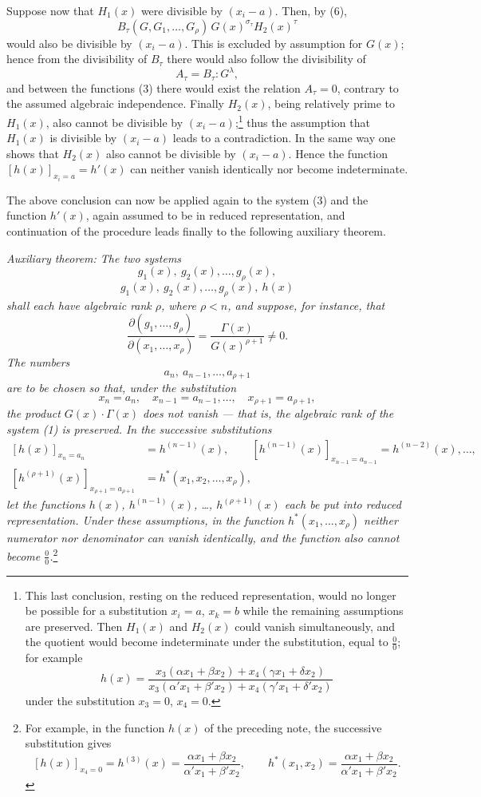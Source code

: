\documentclass[11pt]{article}
\begin{document}
Suppose now that $H_1(x)$ were divisible by $(x_i-a)$. Then, by (6),
\[
  B_\tau(G,G_1,\ldots,G_\rho)\,G(x)^{\sigma_\tau}H_2(x)^\tau
\]
would also be divisible by $(x_i-a)$. This is excluded by assumption for $G(x)$; hence from the divisibility of $B_\tau$ there would also follow the divisibility of
\[
  A_\tau=B_\tau:G^\lambda,
\]
and between the functions (3) there would exist the relation $A_\tau=0$, contrary to the assumed algebraic independence. Finally $H_2(x)$, being relatively prime to $H_1(x)$, also cannot be divisible by $(x_i-a)$;\footnote{This last conclusion, resting on the reduced representation, would no longer be possible for a substitution $x_i=a$, $x_k=b$ while the remaining assumptions are preserved. Then $H_1(x)$ and $H_2(x)$ could vanish simultaneously, and the quotient would become indeterminate under the substitution, equal to $\frac{0}{0}$; for example
\[
 h(x)=\frac{x_3(\alpha x_1+\beta x_2)+x_4(\gamma x_1+\delta x_2)}
 {x_3(\alpha' x_1+\beta' x_2)+x_4(\gamma' x_1+\delta' x_2)}
\]
under the substitution $x_3=0$, $x_4=0$.} thus the assumption that $H_1(x)$ is divisible by $(x_i-a)$ leads to a contradiction. In the same way one shows that $H_2(x)$ also cannot be divisible by $(x_i-a)$. Hence the function $[h(x)]_{x_i=a}=h'(x)$ can neither vanish identically nor become indeterminate.

The above conclusion can now be applied again to the system (3) and the function $h'(x)$, again assumed to be in reduced representation, and continuation of the procedure leads finally to the following auxiliary theorem.

\emph{Auxiliary theorem: The two systems}
\[
  g_1(x),\ g_2(x),\ldots,g_\rho(x),
\]
\[
  g_1(x),\ g_2(x),\ldots,g_\rho(x),\ h(x)
\]
\emph{shall each have algebraic rank $\rho$, where $\rho<n$, and suppose, for instance, that}
\[
 \frac{\partial(g_1,\ldots,g_\rho)}{\partial(x_1,\ldots,x_\rho)}
 =\frac{\Gamma(x)}{G(x)^{\rho+1}}\ne0.
\]
\emph{The numbers}
\[
  a_n,\ a_{n-1},\ldots,a_{\rho+1}
\]
\emph{are to be chosen so that, under the substitution}
\[
  x_n=a_n,\quad x_{n-1}=a_{n-1},\ldots,\quad x_{\rho+1}=a_{\rho+1},
\]
\emph{the product $G(x)\cdot\Gamma(x)$ does not vanish --- that is, the algebraic rank of the system (1) is preserved. In the successive substitutions}
\[
\begin{aligned}
 [h(x)]_{x_n=a_n}&=h^{(n-1)}(x),\qquad
 [h^{(n-1)}(x)]_{x_{n-1}=a_{n-1}}=h^{(n-2)}(x),\ldots,\\
 [h^{(\rho+1)}(x)]_{x_{\rho+1}=a_{\rho+1}}&=h^*(x_1,x_2,\ldots,x_\rho),
\end{aligned}
\]
\emph{let the functions $h(x)$, $h^{(n-1)}(x)$, \ldots, $h^{(\rho+1)}(x)$ each be put into reduced representation. Under these assumptions, in the function $h^*(x_1,\ldots,x_\rho)$ neither numerator nor denominator can vanish identically, and the function also cannot become $\frac{0}{0}$.}\footnote{For example, in the function $h(x)$ of the preceding note, the successive substitution gives
\[
 [h(x)]_{x_4=0}=h^{(3)}(x)=\frac{\alpha x_1+\beta x_2}{\alpha' x_1+\beta' x_2},\qquad
 h^*(x_1,x_2)=\frac{\alpha x_1+\beta x_2}{\alpha' x_1+\beta' x_2}.
\]}
\end{document}
